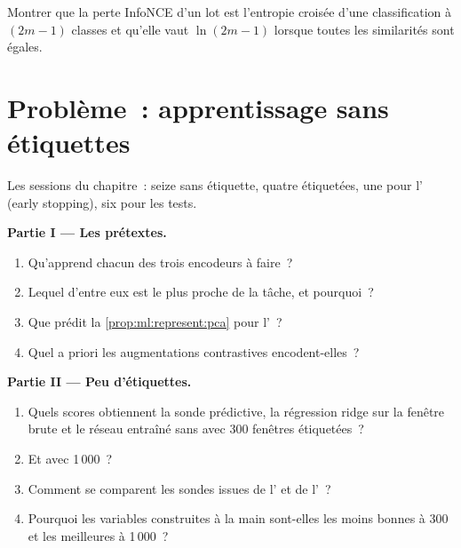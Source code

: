 \begin{exercise}[$\star\star\star$]\label{exo:ml:representation-learning:8}
Montrer que la perte InfoNCE d'un lot est l'entropie croisée d'une classification à $(2m - 1)$ classes et qu'elle vaut
$\ln(2m - 1)$ lorsque toutes les similarités sont égales.
\end{exercise}

\section{Problème~: apprentissage sans étiquettes}

\begin{problem}\label{pb:ml:representation-learning:1}
Les sessions du chapitre~: seize sans étiquette, quatre étiquetées, une pour l' (early stopping), six pour les tests.

\medskip\noindent\textbf{Partie I --- Les prétextes.}
\begin{enumerate}
\item Qu'apprend chacun des trois encodeurs à faire~?
\item Lequel d'entre eux est le plus proche de la tâche, et pourquoi~?
\item Que prédit la \cref{prop:ml:represent:pca} pour l'~?
\item Quel a priori les augmentations contrastives encodent-elles~?
\end{enumerate}

\medskip\noindent\textbf{Partie II --- Peu d'étiquettes.}
\begin{enumerate}[resume]
\item Quels scores obtiennent la sonde prédictive, la régression ridge sur la fenêtre brute et le réseau entraîné sans  avec 300 fenêtres étiquetées~?
\item Et avec 1\,000~?
\item Comment se comparent les sondes issues de l' et de l'~?
\item Pourquoi les variables construites à la main sont-elles les moins bonnes à 300 et les meilleures à 1\,000~?
\end{enumerate}


\end{problem}
